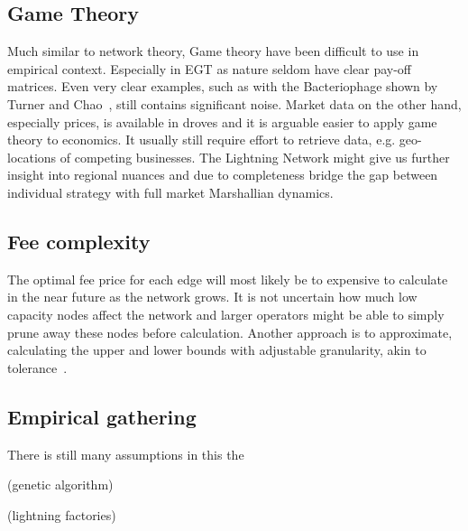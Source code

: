 \subsection{Game Theory}

Much similar to network theory, Game theory have been difficult to use in empirical context. Especially in EGT as nature seldom have clear pay-off matrices. Even very clear examples, such as with the Bacteriophage shown by Turner and Chao~\cite{turner:chao:prisoners:dilemma, nowak:sigmund:phage}, still contains significant noise. Market data on the other hand, especially prices, is available in droves and it is arguable easier to apply game theory to economics. It usually still require effort to retrieve data, e.g. geo-locations of competing businesses. The \gls{Lightning Network} might give us further insight into regional nuances and due to completeness bridge the gap between individual strategy with full market Marshallian dynamics.    

\subsection{Fee complexity}

The optimal fee price for each edge will most likely be to expensive to calculate in the near future as the network grows. It is not uncertain how much low capacity nodes affect the network and larger operators might be able to simply prune away these nodes before calculation. Another approach is to approximate, calculating the upper and lower bounds with adjustable granularity, akin to tolerance~\cite{goldengorin:jager:tolerance}. 

\subsection{Empirical gathering}

There is still many assumptions in this the

(genetic algorithm)

(lightning factories)

